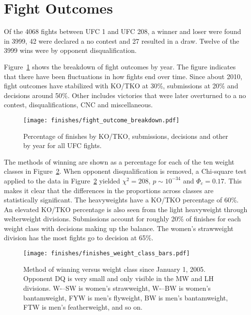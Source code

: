 \clearpage
\section{Fight Outcomes}

Of the 4068 fights between UFC 1 and UFC 208,
a winner and loser were found in 3999,
42 were declared a no contest and 27 resulted in a draw.
Twelve of the 3999 wins were by opponent disqualification.

Figure~\ref{fight_outcome_by_year} shows the breakdown of fight
outcomes by year. 
The figure indicates that there have been fluctuations in how
fights end over time. Since about 2010, fight outcomes have
stabilized with KO/TKO at 30\%, submissions at 20\% and decisions
around 50\%.
Other includes victories that were later overturned to a no contest,
disqualifications, CNC and miscellaneous.

\begin{figure}[h]
\begin{center}
\texttt{[image: finishes/fight\_outcome\_breakdown.pdf]}
\caption{Percentage of finishes by KO/TKO, submissions, decisions and other by year for all UFC fights.}
\label{fight_outcome_by_year}
\end{center}
\end{figure}

The methods of winning are shown as a percentage for each
of the ten weight classes in Figure~\ref{finishes_weight_class_bars}.
When opponent disqualification is removed, a Chi-square test
applied to the data in Figure~\ref{finishes_weight_class_bars}
yielded $\chi^2=208$, $p \sim 10^{-34}$ and $\Phi_c=0.17$. This makes it
clear that the differences in the proportions across classes are
statistically significant.
The heavyweights have a KO/TKO percentage of 60\%.
An elevated KO/TKO percentage is also seen from the light heavyweight
through welterweight divisions.
Submissions account for roughly 20\% of finishes for each weight class with
decisions making up the balance. The women's strawweight division has the
most fights go to decision at 65\%.

\begin{figure}[h]
\begin{center}
\texttt{[image: finishes/finishes\_weight\_class\_bars.pdf]}
\caption{Method of winning versus weight class since January 1, 2005.
Opponent DQ is very small and only visible in the MW and LH divisions.
W-–SW is women's strawweight, W-–BW is women's bantamweight, FYW is
men's flyweight, BW is men's bantamweight, FTW is men's
featherweight, and so on.}
\label{finishes_weight_class_bars}
\end{center}
\end{figure}

